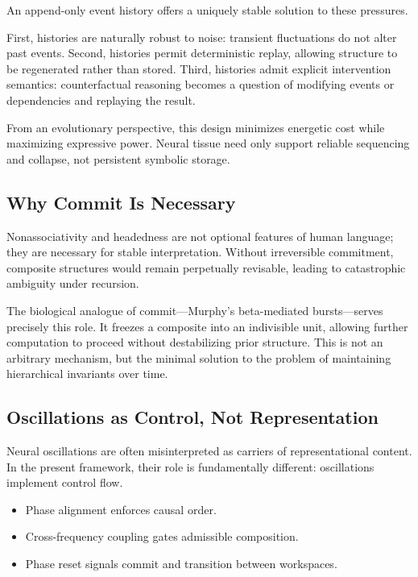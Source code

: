 \documentclass[11pt]{article}
\begin{document}
An append-only event history offers a uniquely stable solution to these pressures.

First, histories are naturally robust to noise: transient fluctuations do not alter past events. Second, histories permit deterministic replay, allowing structure to be regenerated rather than stored. Third, histories admit explicit intervention semantics: counterfactual reasoning becomes a question of modifying events or dependencies and replaying the result.

From an evolutionary perspective, this design minimizes energetic cost while maximizing expressive power. Neural tissue need only support reliable sequencing and collapse, not persistent symbolic storage.

\subsection{Why Commit Is Necessary}

Nonassociativity and headedness are not optional features of human language; they are necessary for stable interpretation. Without irreversible commitment, composite structures would remain perpetually revisable, leading to catastrophic ambiguity under recursion.

The biological analogue of commit—Murphy’s beta-mediated bursts—serves precisely this role. It freezes a composite into an indivisible unit, allowing further computation to proceed without destabilizing prior structure. This is not an arbitrary mechanism, but the minimal solution to the problem of maintaining hierarchical invariants over time.

\subsection{Oscillations as Control, Not Representation}

Neural oscillations are often misinterpreted as carriers of representational content. In the present framework, their role is fundamentally different: oscillations implement control flow.

\begin{itemize}
  \item Phase alignment enforces causal order.
  \item Cross-frequency coupling gates admissible composition.
  \item Phase reset signals commit and transition between workspaces.
\end{itemize}
\end{document}
